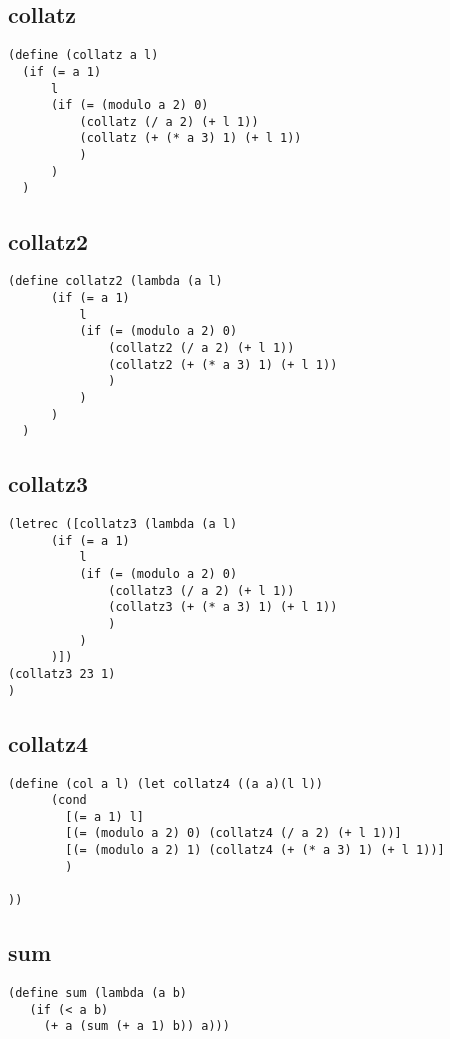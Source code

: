 \begin{multicols}{2}[]

\subsection{collatz}%
\label{sub:collatz}
\begin{lstlisting}
(define (collatz a l)
  (if (= a 1)
      l
      (if (= (modulo a 2) 0)
          (collatz (/ a 2) (+ l 1))
          (collatz (+ (* a 3) 1) (+ l 1))
          )
      )
  )
\end{lstlisting}\vfill\null


\subsection{collatz2}%
\label{sub:collatz2}
\begin{lstlisting}
(define collatz2 (lambda (a l)
      (if (= a 1)
          l
          (if (= (modulo a 2) 0)
              (collatz2 (/ a 2) (+ l 1))
              (collatz2 (+ (* a 3) 1) (+ l 1))
              )
          )
      )
  )
\end{lstlisting}\vfill\null

\subsection{collatz3}%
\label{sub:collatz3}
\begin{lstlisting}
(letrec ([collatz3 (lambda (a l)
      (if (= a 1)
          l
          (if (= (modulo a 2) 0)
              (collatz3 (/ a 2) (+ l 1))
              (collatz3 (+ (* a 3) 1) (+ l 1))
              )
          )
      )])
(collatz3 23 1)
)
\end{lstlisting}\vfill\null

\begin{minipage}{\linewidth}
\subsection{collatz4}%
\label{sub:collatz4}
\begin{lstlisting}
(define (col a l) (let collatz4 ((a a)(l l))
      (cond
        [(= a 1) l]
        [(= (modulo a 2) 0) (collatz4 (/ a 2) (+ l 1))]
        [(= (modulo a 2) 1) (collatz4 (+ (* a 3) 1) (+ l 1))]
        )

))
\end{lstlisting}
\end{minipage}


\subsection{sum}%
\label{sub:sum}
\begin{lstlisting}
(define sum (lambda (a b)
   (if (< a b)
     (+ a (sum (+ a 1) b)) a)))
\end{lstlisting}
\end{multicols}

